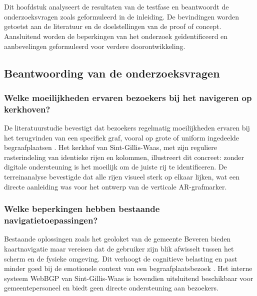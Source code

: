 \chapter{}%
\label{ch:analyse-evaluatie}

Dit hoofdstuk analyseert de resultaten van de testfase en beantwoordt de
onderzoeksvragen zoals geformuleerd in de inleiding. De bevindingen worden
getoetst aan de literatuur en de doelstellingen van de proof of concept.
Aansluitend worden de beperkingen van het onderzoek geïdentificeerd en
aanbevelingen geformuleerd voor verdere doorontwikkeling.

\section{Beantwoording van de onderzoeksvragen}

\subsection{Welke moeilijkheden ervaren bezoekers bij het navigeren op kerkhoven?}

De literatuurstudie bevestigt dat bezoekers regelmatig moeilijkheden ervaren bij
het terugvinden van een specifiek graf, vooral op grote of uniform ingedeelde
begraafplaatsen \autocite{Haekkilae2022}. Het kerkhof van Sint-Gillis-Waas, met
zijn reguliere rasterindeling van identieke rijen en kolommen, illustreert dit
concreet: zonder digitale ondersteuning is het moeilijk om de juiste rij te
identificeren. De terreinanalyse bevestigde dat alle rijen visueel sterk op
elkaar lijken, wat een directe aanleiding was voor het ontwerp van de
verticale AR-grafmarker.

\subsection{Welke beperkingen hebben bestaande navigatietoepassingen?}

Bestaande oplossingen zoals het geoloket van de gemeente Beveren bieden
kaartnavigatie maar vereisen dat de gebruiker zijn blik afwisselt tussen het
scherm en de fysieke omgeving. Dit verhoogt de cognitieve belasting en past
minder goed bij de emotionele context van een begraafplaatsbezoek
\autocite{Zhao2025}. Het interne systeem WebBGP van Sint-Gillis-Waas is
bovendien uitsluitend beschikbaar voor gemeentepersoneel en biedt geen
directe ondersteuning aan bezoekers.

